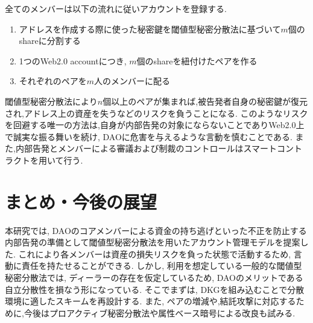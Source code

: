 \documentclass[twocolumn,10pt]{jarticle}
\begin{document}
全てのメンバーは以下の流れに従いアカウントを登録する.

\begin{enumerate}
  \vspace{-5pt}
  \item アドレスを作成する際に使った秘密鍵を閾値型秘密分散法に基づいて$m$個のshareに分割する\vspace{-5pt}
  \item 1つのWeb2.0 accountにつき, $m$個のshareを紐付けたペアを作る\vspace{-5pt}
  \item それぞれのペアを$m$人のメンバーに配る\vspace{-5pt}
\end{enumerate}

閾値型秘密分散法により$n$個以上のペアが集まれば,被告発者自身の秘密鍵が復元され,アドレス上の資産を失うなどのリスクを負うことになる.
このようなリスクを回避する唯一の方法は,自身が内部告発の対象にならないことでありWeb2.0上で誠実な振る舞いを続け, DAOに危害を与えるような言動を慎むことである.
また,内部告発とメンバーによる審議および制裁のコントロールはスマートコントラクトを用いて行う.
\vspace{-0.55cm}
\section{\normalsize まとめ・今後の展望}
\vspace{-0.2cm}
本研究では, DAOのコアメンバーによる資金の持ち逃げといった不正を防止する内部告発の準備として閾値型秘密分散法を用いたアカウント管理モデルを提案した.
これにより各メンバーは資産の損失リスクを負った状態で活動するため, 言動に責任を持たせることができる.
しかし, 利用を想定している一般的な閾値型秘密分散法では, ディーラーの存在を仮定しているため, DAOのメリットである自立分散性を損なう形になっている.
そこでまずは, DKGを組み込むことで分散環境に適したスキームを再設計する.
また, ペアの増減や,結託攻撃に対応するために,今後はプロアクティブ秘密分散法や属性ベース暗号による改良も試みる.
\end{document}
